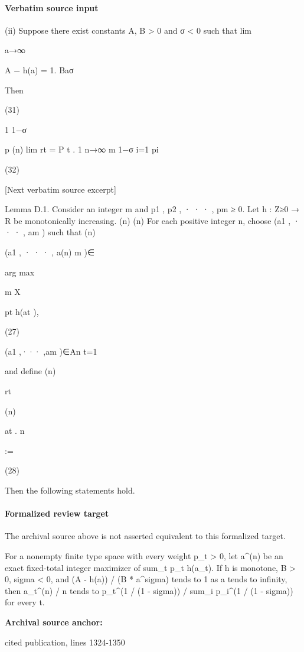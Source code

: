 \documentclass[10pt]{article}
\begin{document}
\paragraph{Verbatim source input}
\begin{ReviewVerbatim}
(ii) Suppose there exist constants A, B > 0 and σ < 0 such that
lim

a→∞

A − h(a)
= 1.
Baσ

Then

(31)

1
1−σ

p
(n)
lim rt = P t
.
1
n→∞
m
1−σ
i=1 pi

(32)

[Next verbatim source excerpt]

Lemma D.1. Consider an integer m and p1 , p2 , · · · , pm ≥ 0. Let h : Z≥0 → R be monotonically increasing.
(n)
(n)
For each positive integer n, choose (a1 , · · · , am ) such that
(n)

(a1 , · · · , a(n)
m )∈

arg max

m
X

pt h(at ),

(27)

(a1 ,··· ,am )∈An t=1

and define
(n)

rt

(n)

at
.
n

:=

(28)

Then the following statements hold.
\end{ReviewVerbatim}


\paragraph{Formalized review target}
The archival source above is not asserted equivalent to this formalized target.
\begin{ReviewVerbatim}
For a nonempty finite type space with every weight p_t > 0, let a^(n) be an exact fixed-total integer maximizer of sum_t p_t h(a_t). If h is monotone, B > 0, sigma < 0, and (A - h(a)) / (B * a^sigma) tends to 1 as a tends to infinity, then a_t^(n) / n tends to p_t^(1 / (1 - sigma)) / sum_i p_i^(1 / (1 - sigma)) for every t.
\end{ReviewVerbatim}

\textbf{Archival source anchor:} {\footnotesize\raggedright cited publication, lines 1324-\allowbreak{}1350\par}
\end{document}
